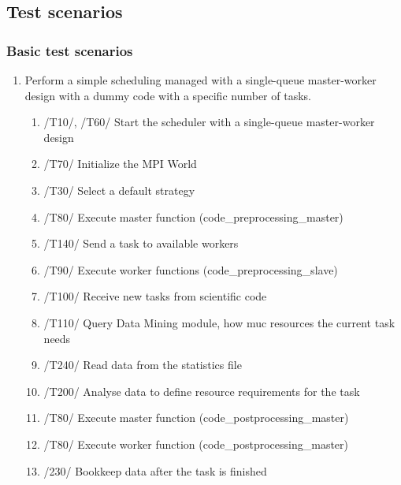 {		
				
		
		
		\subsection{Test scenarios}
		
		\subsubsection{Basic test scenarios}
		
		\begin{enumerate}
			\item Perform a simple scheduling managed with a single-queue master-worker design with a dummy code with a specific number of tasks.
			\begin{enumerate}
				\item /T10/, /T60/ Start the scheduler with a single-queue master-worker design
				\item /T70/ Initialize the MPI World
				\item /T30/ Select a default strategy
				\item /T80/ Execute master function (code\_preprocessing\_master)
				\item /T140/ Send a task to available workers
				\item /T90/ Execute worker functions (code\_preprocessing\_slave)
				\item /T100/ Receive new tasks from scientific code
				\item /T110/ Query Data Mining module, how muc resources the current task needs
				\item /T240/ Read data from the statistics file
				\item /T200/ Analyse data to define resource requirements for the task
				\item /T80/ Execute master function (code\_postprocessing\_master)
				\item /T80/ Execute worker function (code\_postprocessing\_master)
				\item /230/ Bookkeep data after the task is finished
			\end{enumerate}
			

\end{enumerate}}
